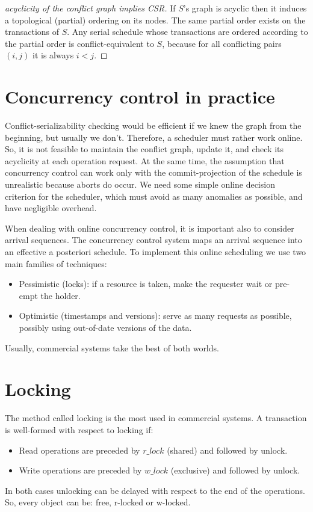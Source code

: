 \documentclass[12pt, a4paper]{report}
\newtheorem[style=M,bodystyle=\normalfont]{theorem}{Theorem}
\newtheorem[style=M,bodystyle=\normalfont]{corollary}{Corollary}
\newtheorem[style=M,bodystyle=\normalfont]{lemma}{Lemma}
\newtheorem[style=M,bodystyle=\normalfont]{definition}{Definition}
\begin{document}
    \begin{proof}[acyclicity of the conflict graph implies CSR]
        If $S$'s graph is acyclic then it induces a topological (partial) ordering on its nodes. The same partial order exists on the transactions of $S$. 
        Any serial schedule whose transactions are ordered according to the partial order is conflict-equivalent to $S$, because for all conflicting pairs $(i,j)$ it is always $i<j$. 
    \end{proof}
        
    \section{Concurrency control in practice}
    Conflict-serializability checking would be efficient if we knew the graph from the beginning, but usually we don't. Therefore, a scheduler must rather work online. 
    So, it is not feasible to maintain the conflict graph, update it, and check its acyclicity at each operation request. At the same time, the assumption that concurrency control 
    can work only with the commit-projection of the schedule is unrealistic because aborts do occur. We need some simple online decision criterion for the scheduler, which must 
    avoid as many anomalies as possible, and have negligible overhead. 
        
    When dealing with online concurrency control, it is important also to consider arrival sequences. The concurrency control system maps an arrival sequence into an effective a 
    posteriori schedule. To implement this online scheduling we use two main families of techniques:
    \begin{itemize}
        \item Pessimistic (locks): if a resource is taken, make the requester wait or pre-empt the holder.
        \item Optimistic (timestamps and versions): serve as many requests as possible, possibly using out-of-date versions of the data. 
    \end{itemize}
    Usually, commercial systems take the best of both worlds. 

    \section{Locking}
    The method called locking is the most used in commercial systems. A transaction is well-formed with respect to locking if: 
    \begin{itemize}
        \item Read operations are preceded by $r\_lock$ (shared) and followed by unlock. 
        \item Write operations are preceded by $w\_lock$ (exclusive) and followed by unlock. 
    \end{itemize}
    In both cases unlocking can be delayed with respect to the end of the operations. So, every object can be: free, r-locked or w-locked. 
\end{document}
